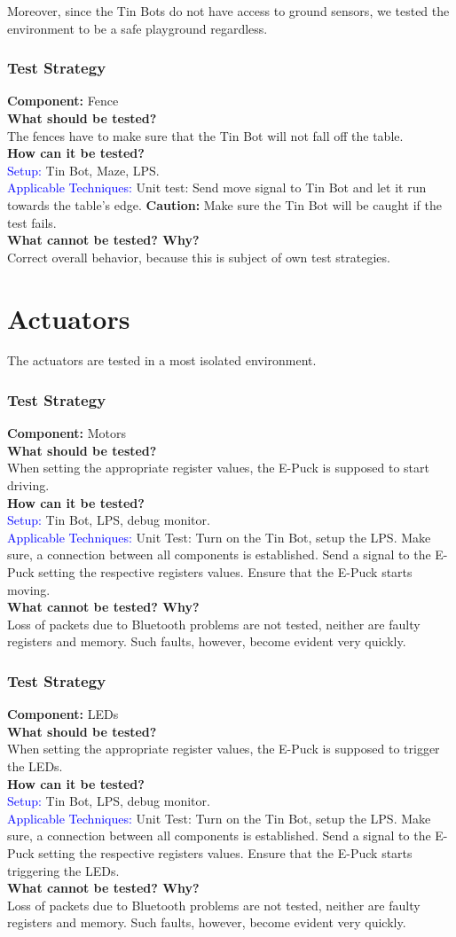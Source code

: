 \documentclass[a4paper,parskip,headheight=38pt]{scrartcl} %
\newcommand{\teststrat}[5]{
    \subsubsection{Test Strategy}
	\textbf{Component:} #1 \\
	\noindent\textbf{What should be tested?} \\
    \noindent #2 \\
	\noindent\textbf{How can it be tested?} \\
    \noindent\textcolor{blue}{Setup:} #3 \\
    \noindent\textcolor{blue}{Applicable Techniques:} #4 \\
	\noindent\textbf{What cannot be tested? Why?} \\
    \noindent #5
}
\begin{document}
Moreover, since the Tin Bots do not have access to ground sensors, we tested the
environment to be a safe playground regardless.

\teststrat{Fence}{
    The fences have to make sure that the Tin Bot will not fall off the table.
}{
    Tin Bot, Maze, LPS.
}{
    Unit test: Send move signal to Tin Bot and let it run towards the table's
    edge. \textbf{Caution:} Make sure the Tin Bot will be caught if the test
    fails.
}{
    Correct overall behavior, because this is subject of own test strategies.
}

\section{Actuators}

The actuators are tested in a most isolated environment.

\teststrat{Motors}{
    When setting the appropriate register values, the E-Puck is supposed to
    start driving.
}{
    Tin Bot, LPS, debug monitor.
}{
    Unit Test: Turn on the Tin Bot, setup the LPS. Make sure, a connection
    between all components is established. Send a signal to the E-Puck setting
    the respective registers values. Ensure that the E-Puck starts moving.
}{
    Loss of packets due to Bluetooth problems are not tested, neither are faulty
    registers and memory. Such faults, however, become evident very quickly.
}

\teststrat{LEDs}{
    When setting the appropriate register values, the E-Puck is supposed to
    trigger the LEDs.
}{
    Tin Bot, LPS, debug monitor.
}{
    Unit Test: Turn on the Tin Bot, setup the LPS. Make sure, a connection
    between all components is established. Send a signal to the E-Puck setting
    the respective registers values. Ensure that the E-Puck starts triggering
    the LEDs.
}{
    Loss of packets due to Bluetooth problems are not tested, neither are faulty
    registers and memory. Such faults, however, become evident very quickly.
}
\end{document}
